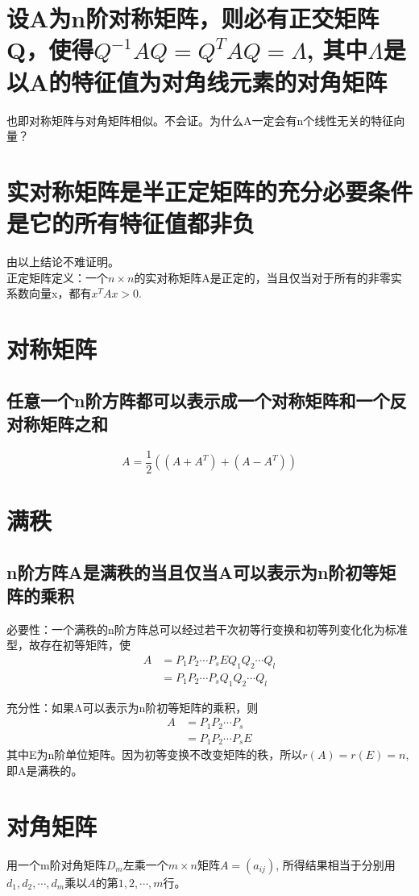 \documentclass[]{article}
\begin{document}
\section{设A为n阶对称矩阵，则必有正交矩阵Q，使得$ Q^{-1}AQ = Q^TAQ = \Lambda $, 其中$ \Lambda $是以A的特征值为对角线元素的对角矩阵}
也即对称矩阵与对角矩阵相似。不会证。为什么A一定会有n个线性无关的特征向量？

\section{实对称矩阵是半正定矩阵的充分必要条件是它的所有特征值都非负}
由以上结论不难证明。\\
正定矩阵定义：一个$ n \times n $的实对称矩阵A是正定的，当且仅当对于所有的非零实系数向量x，都有$ x^T A x > 0 $.

\section{对称矩阵}
\subsection{任意一个n阶方阵都可以表示成一个对称矩阵和一个反对称矩阵之和}
\[ A = \frac{1}{2}((A+A^T)+(A-A^T)) \]

\section{满秩}
\subsection{n阶方阵A是满秩的当且仅当A可以表示为n阶初等矩阵的乘积}
必要性：一个满秩的n阶方阵总可以经过若干次初等行变换和初等列变化化为标准型，故存在初等矩阵，使
\[
\begin{aligned}
A &= P_1P_2\cdots P_s E Q_1 Q_2 \cdots Q_l \\
  &= P_1P_2\cdots P_s Q_1 Q_2 \cdots Q_l
\end{aligned}
\]

充分性：如果A可以表示为n阶初等矩阵的乘积，则
\[
\begin{aligned}
	A &= P_1P_2\cdots P_s \\
	  &= P_1P_2\cdots P_s E
\end{aligned}
\]
其中E为n阶单位矩阵。因为初等变换不改变矩阵的秩，所以$ r(A) = r(E) = n $, 即A是满秩的。
\section{对角矩阵}
用一个m阶对角矩阵$ D_m $左乘一个$ m\times n $矩阵$ A = (a_{ij}) $, 所得结果相当于分别用$ d_1, d_2, \cdots, d_m $乘以$ A $的第$ 1,2,\cdots,m $行。
\end{document}
